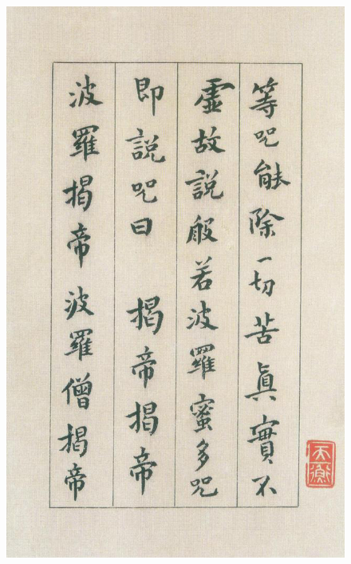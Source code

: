 \documentclass[a4paper,twoside]{article}
\begin{document}
\begin{figure}[ht]
\centering
\includegraphics[width=13.8cm]{images/fushan-7}
\end{figure}
\end{document}

